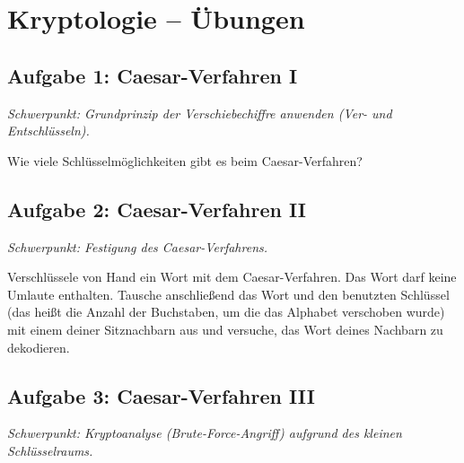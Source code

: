 \clearpage

\rehead[]{\textcolor{lightblue}{AvHG, Inf, My}}
\lohead[]{\textcolor{lightblue}{AvHG, Inf, My}}

\section{Kryptologie -- Übungen}

\subsection{Aufgabe 1: Caesar-Verfahren I \tagGKWahl}
\noindent \emph{Schwerpunkt: Grundprinzip der Verschiebechiffre anwenden (Ver- und Entschlüsseln).}

Wie viele Schlüsselmöglichkeiten gibt es beim Caesar-Verfahren?


\subsection{Aufgabe 2: Caesar-Verfahren II \tagZusatz \tagGKWahl}
\noindent \emph{Schwerpunkt: Festigung des Caesar-Verfahrens.}

Verschlüssele von Hand ein Wort mit dem Caesar-Verfahren. Das Wort darf keine
Umlaute enthalten. Tausche anschließend das Wort und den benutzten Schlüssel
(das heißt die Anzahl der Buchstaben, um die das Alphabet verschoben wurde) mit
einem deiner Sitznachbarn aus und versuche, das Wort deines Nachbarn zu
dekodieren.


\subsection{Aufgabe 3: Caesar-Verfahren III \tagGKWahl}
\noindent \emph{Schwerpunkt: Kryptoanalyse (Brute-Force-Angriff) aufgrund des kleinen Schlüsselraums.}

